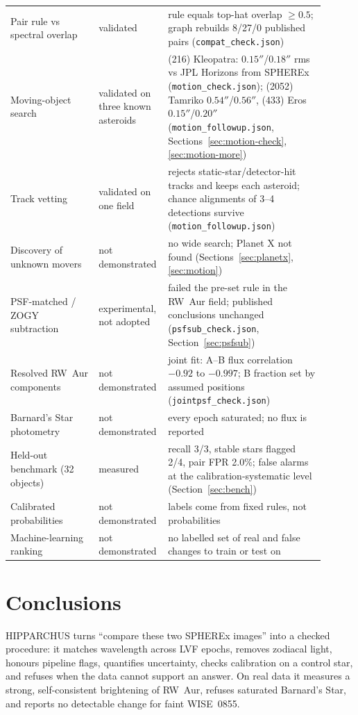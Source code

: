\documentclass[11pt,a4paper]{article}
\begin{document}
\begin{table}[h]
\begin{tabular}{>{\raggedright\arraybackslash}p{0.27\linewidth}>{\raggedright\arraybackslash}p{0.15\linewidth}>{\raggedright\arraybackslash}p{0.48\linewidth}}
Pair rule vs spectral overlap & validated & rule equals top-hat overlap $\ge0.5$; graph rebuilds 8/27/0 published pairs (\texttt{compat\_check.json})\\
Moving-object search & validated on three known asteroids & (216) Kleopatra: $0.15''$/$0.18''$ rms vs JPL Horizons from SPHEREx (\texttt{motion\_check.json}); (2052) Tamriko $0.54''$/$0.56''$, (433) Eros $0.15''$/$0.20''$ (\texttt{motion\_followup.json}, Sections~\ref{sec:motion-check}, \ref{sec:motion-more})\\
Track vetting & validated on one field & rejects static-star/detector-hit tracks and keeps each asteroid; chance alignments of 3--4 detections survive (\texttt{motion\_followup.json})\\\midrule
Discovery of unknown movers & not demonstrated & no wide search; Planet X not found (Sections~\ref{sec:planetx}, \ref{sec:motion})\\
PSF-matched / ZOGY subtraction & experimental, not adopted & failed the pre-set rule in the RW~Aur field; published conclusions unchanged (\texttt{psfsub\_check.json}, Section~\ref{sec:psfsub})\\
Resolved RW~Aur components & not demonstrated & joint fit: A--B flux correlation $-0.92$ to $-0.997$; B fraction set by assumed positions (\texttt{jointpsf\_check.json})\\
Barnard's Star photometry & not demonstrated & every epoch saturated; no flux is reported\\
Held-out benchmark (32 objects) & measured & recall 3/3, stable stars flagged 2/4, pair FPR 2.0\%; false alarms at the calibration-systematic level (Section~\ref{sec:bench})\\
Calibrated probabilities & not demonstrated & labels come from fixed rules, not probabilities\\
Machine-learning ranking & not demonstrated & no labelled set of real and false changes to train or test on\\\bottomrule
\end{tabular}
\end{table}

\section{Conclusions}
HIPPARCHUS turns ``compare these two SPHEREx images'' into a checked procedure: it matches wavelength across LVF
epochs, removes zodiacal light, honours pipeline flags, quantifies uncertainty, checks calibration on a control star,
and refuses when the data cannot support an answer. On real data it measures a strong, self-consistent brightening of
RW~Aur, refuses saturated Barnard's Star, and reports no detectable change for faint WISE~0855.
\end{document}
